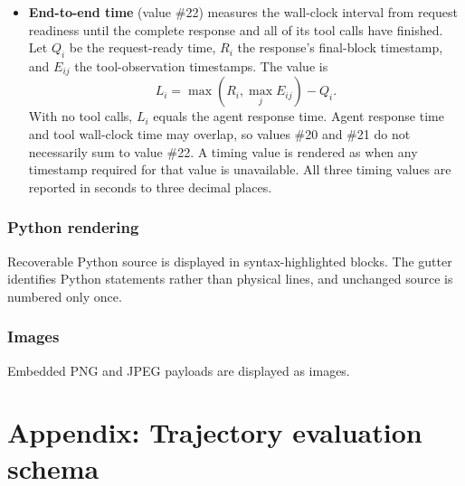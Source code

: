 \documentclass[11pt]{article}
\begin{document}
\begin{itemize}
  \item \textbf{End-to-end time} (value \#22) measures the wall-clock interval from request readiness until the complete response and all of its tool calls have finished.
  Let \(Q_i\) be the request-ready time, \(R_i\) the response's final-block timestamp, and \(E_{ij}\) the tool-observation timestamps.
  The value is
  \[
    L_i = \max\!\left(R_i, \max_j E_{ij}\right) - Q_i.
  \]
  With no tool calls, \(L_i\) equals the agent response time.
  Agent response time and tool wall-clock time may overlap, so values \#20 and \#21 do not necessarily sum to value \#22.
  A timing value is rendered as \code{-} when any timestamp required for that value is unavailable.
  All three timing values are reported in seconds to three decimal places.
\end{itemize}

\subsubsection*{Python rendering}
Recoverable Python source is displayed in syntax-highlighted blocks.
The gutter identifies Python statements rather than physical lines, and unchanged source is numbered only once.

\subsubsection*{Images}
Embedded PNG and JPEG payloads are displayed as images.


\section*{Appendix: Trajectory evaluation schema}
\label{sec:trajectory-evaluation-schema-appendix}
\end{document}
